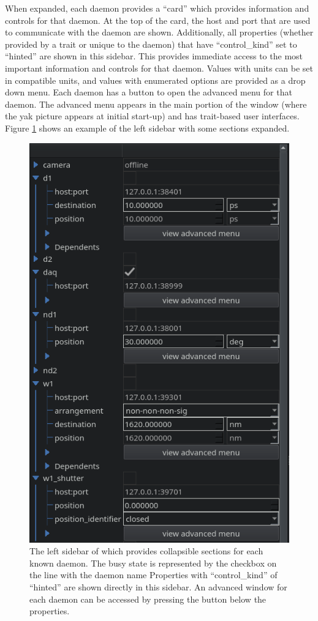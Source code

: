 When expanded, each daemon provides a ``card'' which provides information and controls for that daemon.
At the top of the card, the host and port that are used to communicate with the daemon are shown.
Additionally, all properties (whether provided by a trait or unique to the daemon) that have ``control\_kind'' set to ``hinted'' are shown in this sidebar.
This provides immediate access to the most important information and controls for that daemon.
Values with units can be set in compatible units, and values with enumerated options are provided as a drop down menu.
Each daemon has a button to open the advanced menu for that daemon.
The advanced menu appears in the main portion of the window (where the yak picture appears at initial start-up) and has trait-based user interfaces.
Figure \ref{yaq:fig:left_sidebar} shows an example of the left sidebar with some sections expanded.

\begin{figure}
\includegraphics[width=4.5in]{"yaq/images/left_sidebar"}
\caption[\yaqcqtpy{} Left Sidebar]{
	The left sidebar of \yaqcqtpy{} which provides collapsible sections for each known daemon.
	The busy state is represented by the checkbox on the line with the daemon name
	Properties with ``control\_kind'' of ``hinted'' are shown directly in this sidebar.
	An advanced window for each daemon can be accessed by pressing the button below the properties.
}
\label{yaq:fig:left_sidebar}
\end{figure}

